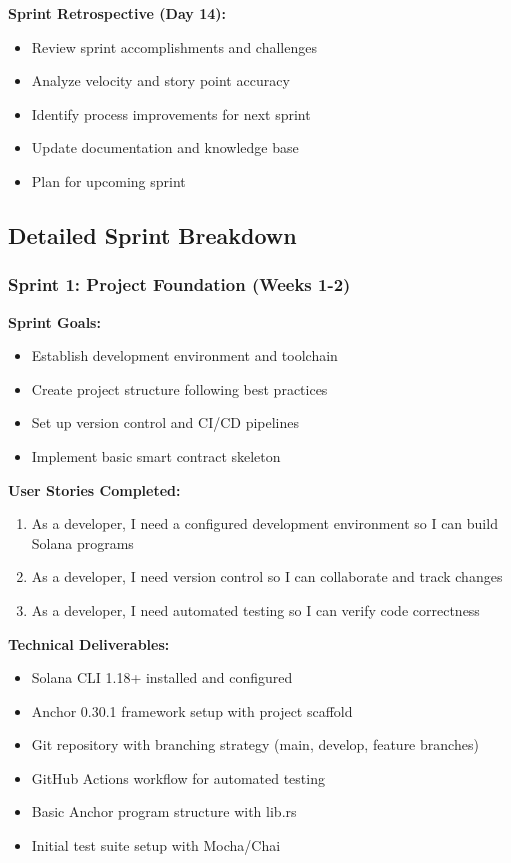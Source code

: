 \documentclass[a4paper,13pt,twoside]{report}
\theoremstyle{definition}
\begin{document}
\textbf{Sprint Retrospective (Day 14):}
\begin{itemize}
    \item Review sprint accomplishments and challenges
    \item Analyze velocity and story point accuracy
    \item Identify process improvements for next sprint
    \item Update documentation and knowledge base
    \item Plan for upcoming sprint
\end{itemize}

\subsection{Detailed Sprint Breakdown}

\subsubsection{Sprint 1: Project Foundation (Weeks 1-2)}

\textbf{Sprint Goals:}
\begin{itemize}
    \item Establish development environment and toolchain
    \item Create project structure following best practices
    \item Set up version control and CI/CD pipelines
    \item Implement basic smart contract skeleton
\end{itemize}

\textbf{User Stories Completed:}
\begin{enumerate}
    \item As a developer, I need a configured development environment so I can build Solana programs
    \item As a developer, I need version control so I can collaborate and track changes
    \item As a developer, I need automated testing so I can verify code correctness
\end{enumerate}

\textbf{Technical Deliverables:}
\begin{itemize}
    \item Solana CLI 1.18+ installed and configured
    \item Anchor 0.30.1 framework setup with project scaffold
    \item Git repository with branching strategy (main, develop, feature branches)
    \item GitHub Actions workflow for automated testing
    \item Basic Anchor program structure with lib.rs
    \item Initial test suite setup with Mocha/Chai
\end{itemize}
\end{document}
